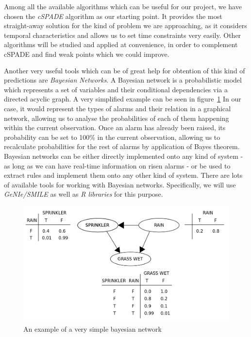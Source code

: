 \documentclass[a4paper,10pt]{report}
\begin{document}
Among all the available algorithms which can be useful for our project, we have chosen the \emph{cSPADE} algorithm as our starting point. It provides the most straight-away solution for the kind of problem we are approaching, as it considers temporal characteristics and allows us to set time constraints very easily. Other algorithms will be studied and applied at convenience, in order to complement cSPADE and find weak points which we could improve.

Another very useful tools which can be of great help for obtention of this kind of predictions are \emph{Bayesian Networks}\cite{Jensen2009}. A Bayesian network is a probabilistic model which represents a set of variables and their conditional dependencies via a directed acyclic graph. A very simplified example can be seen in figure~\ref{fig:bayesian_example} In our case, it would represent the types of alarms and their relation in a graphical network, allowing us to analyse the probabilities of each of them happening within the current observation. Once an alarm has already been raised, its probability can be set to 100\% in the current observation, allowing us to recalculate probabilities for the rest of alarms by application of Bayes theorem. Bayesian networks can be either directly implemented onto any kind of system - as long as we can have real-time information on risen alarms - or be used to extract rules and implement them onto any other kind of system. There are lots of available tools for working with Bayesian networks. Specifically, we will use \emph{GeNIe/SMILE} as well as \emph{R libraries} for this purpose.

\begin{figure}[hbtp]
\includegraphics[width=\textwidth]{img/bayesian_example.png}
\caption{An example of a very simple bayesian network} \label{fig:bayesian_example}
\end{figure}
\end{document}
